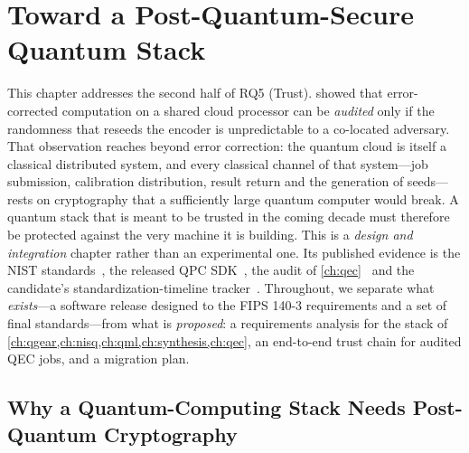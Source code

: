 \chapter{Toward a Post-Quantum-Secure Quantum Stack}\label{ch:pqc}



This chapter addresses the second half of RQ5 (Trust).  showed that error-corrected computation on a shared cloud processor can be \emph{audited} only if the randomness that reseeds the encoder is unpredictable to a co-located adversary. That observation reaches beyond error correction: the quantum cloud is itself a classical distributed system, and every classical channel of that system---job submission, calibration distribution, result return and the generation of seeds---rests on cryptography that a sufficiently large quantum computer would break. A quantum stack that is meant to be trusted in the coming decade must therefore be protected against the very machine it is building. This is a \emph{design and integration} chapter rather than an experimental one. Its published evidence is the NIST standards~\cite{nist2024fips203,nist2024fips204,nist2024fips205,nist2019fips1403,nist2015sp80090a}, the released QPC SDK~\cite{guo2026lightriderqpc}, the audit of \cref{ch:qec}~\cite{guo2026qecaudit} and the candidate's standardization-timeline tracker~\cite{guo2026nisttracker}. Throughout, we separate what \emph{exists}---a software release designed to the FIPS 140-3 requirements and a set of final standards---from what is \emph{proposed}: a requirements analysis for the stack of \cref{ch:qgear,ch:nisq,ch:qml,ch:synthesis,ch:qec}, an end-to-end trust chain for audited QEC jobs, and a migration plan.

\section{Why a Quantum-Computing Stack Needs Post-Quantum Cryptography}\label{sec:pqc:why}

